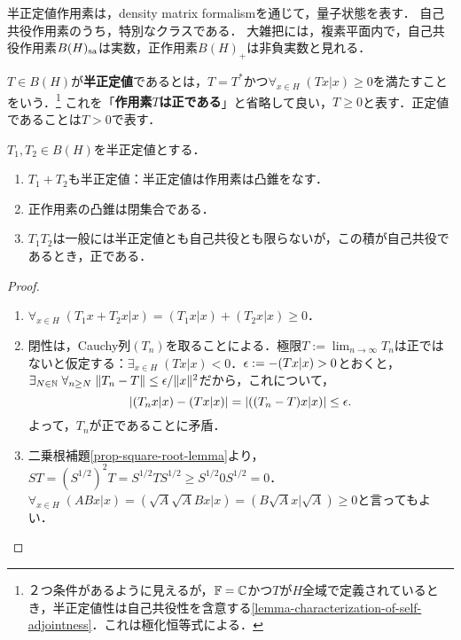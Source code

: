 \documentclass[uplatex,dvipdfmx]{jsreport}
\begin{document}
\begin{tcolorbox}[colframe=ForestGreen, colback=ForestGreen!10!white,breakable,colbacktitle=ForestGreen!40!white,coltitle=black,fonttitle=\bfseries\sffamily,
title=]
    半正定値作用素は，density matrix formalismを通じて，量子状態を表す．
    自己共役作用素のうち，特別なクラスである．
    大雑把には，複素平面内で，自己共役作用素$B(H)_{\mathrm{sa}}$は実数，正作用素$B(H)_+$は非負実数と見れる．
\end{tcolorbox}

\begin{definition}\label{def-positive-operator}
    $T\in B(H)$が\textbf{半正定値}であるとは，$T=T^*$かつ$\forall_{x\in H}\;(Tx|x)\ge 0$を満たすことをいう．\footnote{２つ条件があるように見えるが，$\mathbb{F}=\mathbb{C}$かつ$T$が$H$全域で定義されているとき，半正定値性は自己共役性を含意する\ref{lemma-characterization-of-self-adjointness}．これは極化恒等式による．}
    これを「\textbf{作用素$T$は正である}」と省略して良い，$T\ge 0$と表す．正定値であることは$T>0$で表す．
\end{definition}

\begin{lemma}[正作用素の閉凸錐]\label{lemma-positive-closed-cone-of-positive-operator}
    $T_1,T_2\in B(H)$を半正定値とする．
    \begin{enumerate}
        \item $T_1+T_2$も半正定値：半正定値は作用素は凸錐をなす．
        \item 正作用素の凸錐は閉集合である．
        \item $T_1T_2$は一般には半正定値とも自己共役とも限らないが，この積が自己共役であるとき，正である．
    \end{enumerate}
\end{lemma}
\begin{proof}\mbox{}
    \begin{enumerate}
        \item $\forall_{x\in H}\;(T_1x+T_2x|x)=(T_1x|x)+(T_2x|x)\ge0$．
        \item 閉性は，Cauchy列$(T_n)$を取ることによる．極限$T:=\lim_{n\to\infty}T_n$は正ではないと仮定する：$\exists_{x\in H}\;(Tx|x)<0$．$\epsilon:=-(Tx|x)>0$とおくと，$\exists_{N\in\mathbb{N}}\;\forall_{n\ge N}\;\|T_n-T\|\le\epsilon/\|x\|^2$だから，これについて，
        \[\left|(T_nx|x)-(Tx|x)\right|=\lvert((T_n-T)x|x)\rvert\le\epsilon.\]
        よって，$T_n$が正であることに矛盾．
        \item 二乗根補題\ref{prop-square-root-lemma}より，$ST=(S^{1/2})^2T=S^{1/2}TS^{1/2}\ge S^{1/2}0S^{1/2}=0$．
        $\forall_{x\in H}\;(ABx|x)=(\sqrt{A}\sqrt{A}Bx|x)=(B\sqrt{A}x|\sqrt{A})\ge0$と言ってもよい．
    \end{enumerate}
\end{proof}
\end{document}
